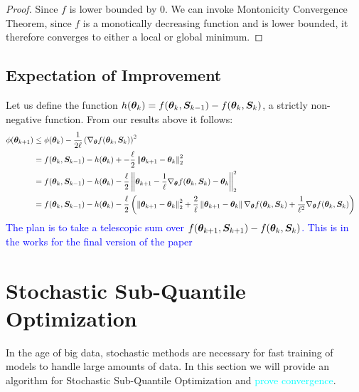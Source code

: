 \documentclass{article} %
\newcommand{\norm}[1]{\left\lVert#1\right\rVert}
\begin{document}
\begin{appendices}
\begin{proof}
	Since $f$ is lower bounded by $0$. We can invoke Montonicity Convergence Theorem, since $f$ is a monotically decreasing function and is lower bounded, it therefore converges to either a local or global minimum. 
	\end{proof}
	
	\subsection{Expectation of Improvement}
	Let us define the function $h({\bm{\theta}}_k) = f({\bm{\theta}}_k,{\bm{S}}_{k-1}) - f({\bm{\theta}}_k,{\bm{S}}_k)$, a strictly non-negative function. From our results above it follows:
	\begin{align*}
		\phi(\vtheta_{k+1}) &\leq \phi(\vtheta_k) - \frac{1}{2\ell}\left(\nabla_\vtheta f(\vtheta_k,\mS_k)\right)^2 &&\\
		&= f(\vtheta_k, \mS_{k-1}) - h(\vtheta_k) +  - \frac{\ell}{2}\norm{\vtheta_{k+1} - \vtheta_k}^2_2 \\
		&= f(\vtheta_k, \mS_{k-1}) - h(\vtheta_k) - \frac{\ell}{2}\norm{\vtheta_{k+1} - \frac{1}{\ell} \nabla_\vtheta f(\vtheta_k,\mS_k) - \vtheta_k}_2^2 &&\\
		&= f(\vtheta_k, \mS_{k-1}) - h(\vtheta_k) - \frac{\ell}{2}\left(\norm{\vtheta_{k+1}-\vtheta_k}_2^2 + \frac{2}{\ell}\norm{\vtheta_{k+1}-\vtheta_k}\nabla_\vtheta f(\vtheta_k,\mS_k) + \frac{1}{\ell^2}\nabla_\vtheta f(\vtheta_k,\mS_k)\right)
	\end{align*}
	\textcolor{blue}{The plan is to take a telescopic sum over $f({\bm{\theta}}_{k+1},{\bm{S}}_{k+1}) - f({\bm{\theta}}_k,{\bm{S}}_k)$. This is in the works for the final version of the paper}
	\newpage
	
	\section{Stochastic Sub-Quantile Optimization}
	In the age of big data, stochastic methods are necessary for fast training of models to handle large amounts of data. In this section we will provide an algorithm for Stochastic Sub-Quantile Optimization and \textcolor{cyan}{prove convergence}.
	\begin{algorithm}[H]
		\DontPrintSemicolon
		

\end{algorithm}
\end{appendices}
\end{document}
